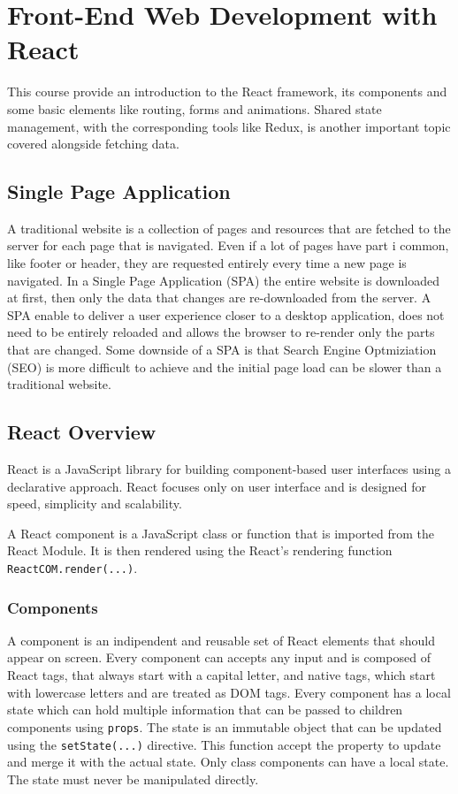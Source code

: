 \section*{Front-End Web Development with React}

This course provide an introduction to the React framework, its components and some basic elements like routing, forms and animations. Shared state management, with the corresponding tools like Redux, is another important topic covered alongside fetching data.

\subsection*{Single Page Application}
A traditional website is a collection of pages and resources that are fetched to the server for each page that is navigated. Even if a lot of pages have part i common, like footer or header, they are requested entirely every time a new page is navigated. In a Single Page Application (SPA) the entire website is downloaded at first, then only the data that changes are re-downloaded from the server. A SPA enable to deliver a user experience closer to a desktop application, does not need to be entirely reloaded and allows the browser to re-render only the parts that are changed. 
Some downside of a SPA is that Search Engine Optmiziation (SEO) is more difficult to achieve and the initial page load can be slower than a traditional website.


\subsection*{React Overview}

React is a JavaScript library for building component-based user interfaces using a declarative approach. React focuses only on user interface and is designed for speed, simplicity and scalability.

A React component is a JavaScript class or function that  is imported from the React Module. It is then rendered using the React's rendering function \texttt{ReactCOM.render(...)}.

\subsubsection*{Components}
A component is an indipendent and reusable set of React elements that should appear on screen. Every component can accepts any input and is composed of React tags, that always start with a capital letter, and native tags, which start with lowercase letters and are treated as DOM tags.
Every component has a local state which can hold multiple information that can be passed to children components using \texttt{props}. The state is an immutable object that can be updated using the \texttt{setState(...)} directive. This function accept the property to update and merge it with the actual state. Only class components can have a local state. The state must never be manipulated directly.

